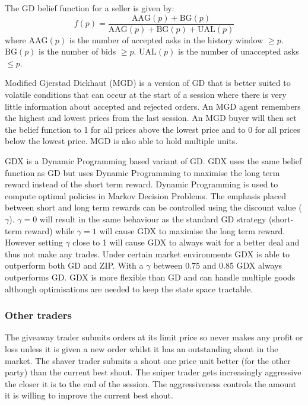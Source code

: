 \documentclass[preprint]{acm_proc_article-sp} %
\begin{document}
The GD belief function for a seller is given by:
\begin{equation}
  f(p) = \frac{\text{AAG}(p) + \text{BG}(p)}{\text{AAG}(p) + \text{BG}(p) +
  \text{UAL}(p)}
\end{equation}
where $\text{AAG}(p)$ is the number of accepted asks in the history window $\geq p$.
$\text{BG}(p)$ is the number of bids $\geq p$. $\text{UAL}(p)$ is the number of unaccepted asks $\leq p$.

Modified Gjerstad Dickhaut (MGD) \cite{mgd} is a version of GD that
is better suited to volatile conditions that can occur at the start of a
session where there is very little information about accepted and rejected
orders.
An MGD agent remembers the highest and lowest prices from the last session.
An MGD buyer will then set the belief function to 1 for all prices above the
lowest price and to 0 for all prices below the lowest price.
MGD is also able to hold multiple units.

GDX \cite{gdx} is a Dynamic Programming based variant of GD.
GDX uses the same belief function as GD but uses Dynamic Programming to
maximise the long term reward instead of the short term reward.
Dynamic Programming is used to compute optimal policies in Markov Decision
Problems.
The emphasis placed between short and long term rewards can be controlled using
the discount value ($\gamma$).
$\gamma = 0$ will result in the same behaviour as the standard GD strategy
(short-term reward) while $\gamma = 1$ will cause GDX to maximise the long term
reward.
However setting $\gamma$ close to 1 will cause GDX to always wait for a better
deal and thus not make any trades.
Under certain market environments GDX is able to outperform
both GD and ZIP.
With a $\gamma$ between 0.75 and 0.85 GDX always outperforms GD.
GDX is more flexible than GD and can handle multiple goods although
optimisations are needed to keep the state space tractable.\\



\subsubsection{Other traders}
The giveaway trader submits orders at its limit price so never makes any profit
or loss unless it is given a new order whilst it has an outstanding shout in
the market. The shaver trader submits a shout one price unit better (for the
other party) than the current best shout. The sniper trader gets increasingly
aggressive the closer it is to the end of the session. The aggressiveness
controls the amount it is willing to improve the current best shout.\\
\end{document}
